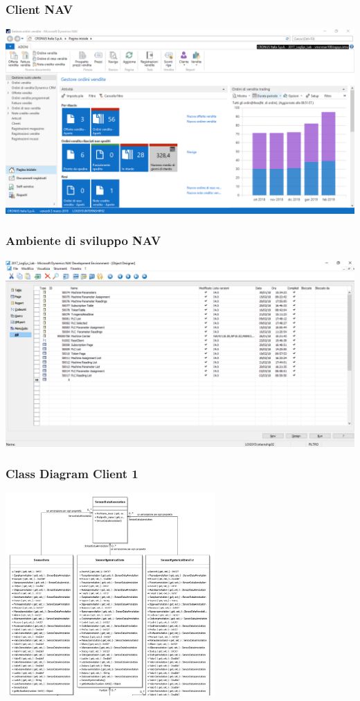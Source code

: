 \documentclass{beamer}
\begin{document}

\begin{frame}
\frametitle{Client NAV}
\includegraphics[width=1\textwidth]{images/NAVClient.png}
\end{frame}

\begin{frame}
\frametitle{Ambiente di sviluppo NAV}
\includegraphics[width=1\textwidth]{images/NAVDevelopmentEnvironment.png}
\end{frame}


\begin{frame}
\frametitle{Class Diagram Client 1}
\includegraphics[width=0.6\textwidth]{images/ClassDiagramParte1.png}
\end{frame}
\end{document}
